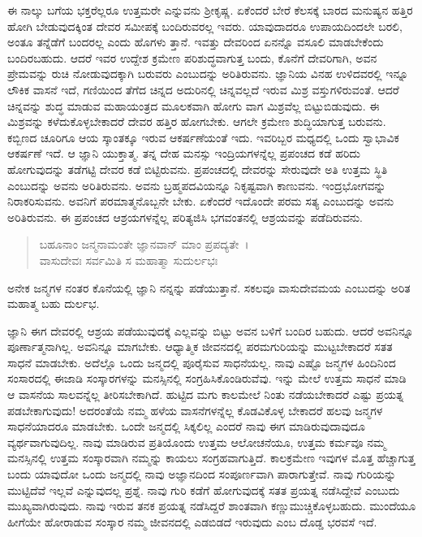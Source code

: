 ಈ ನಾಲ್ಕು ಬಗೆಯ ಭಕ್ತರೆಲ್ಲರೂ ಉತ್ತಮರೇ ಎನ್ನುವನು ಶ‍್ರೀಕೃಷ್ಣ. ಏಕೆಂದರೆ ಬೇರೆ ಕೆಲಸಕ್ಕೆ ಬಾರದ ಮನುಷ್ಯನ ಹತ್ತಿರ ಹೋಗಿ ಬೇಡುವುದಕ್ಕಿಂತ ದೇವರ ಸಮೀಪಕ್ಕೆ ಬಂದಿರುವರಲ್ಲ ಇವರು. ಯಾವುದಾದರೂ ಉಪಾಯದಿಂದಲೇ ಬರಲಿ, ಅಂತೂ ತನ್ನೆಡೆಗೆ ಬಂದರಲ್ಲ ಎಂದು ಹೊಗಳು ತ್ತಾನೆ. ಇವತ್ತು ದೇವರಿಂದ ಏನನ್ನೊ ವಸೂಲಿ ಮಾಡಬೇಕೆಂದು ಬಂದಿರಬಹುದು. ಆದರೆ ಇವರ ಉದ್ದೇಶ ಕ್ರಮೇಣ ಪರಿಶುದ್ಧವಾಗುತ್ತ ಬಂದು, ಕೊನೆಗೆ ದೇವರಿಗಾಗಿ, ಅವನ ಪ್ರೇಮವನ್ನು ರುಚಿ ನೋಡುವುದಕ್ಕಾಗಿ ಬರುವರು ಎಂಬುದನ್ನು ಅರಿತಿರುವನು. ಜ್ಞಾನಿಯ ವಿನಹ ಉಳಿದವರಲ್ಲಿ ಇನ್ನೂ ಲೌಕಿಕ ವಾಸನೆ ಇದೆ, ಗಣಿಯಿಂದ ತೆಗೆದ ಚಿನ್ನದ ಅದುರಿನಲ್ಲಿ ಚಿನ್ನವಲ್ಲದೆ ಇರುವ ಮಿಶ್ರ ವಸ್ತುಗಳಿರುವಂತೆ. ಆದರೆ ಚಿನ್ನವನ್ನು ಶುದ್ಧ ಮಾಡುವ ಮಹಾಯಂತ್ರದ ಮೂಲಕವಾಗಿ ಹೋಗು ವಾಗ ಮಿಶ್ರವೆಲ್ಲ ಬಿಟ್ಟುಬಿಡುವುದು. ಈ ಮಿಶ್ರವನ್ನು ಕಳೆದುಕೊಳ್ಳಬೇಕಾದರೆ ದೇವರ ಹತ್ತಿರ ಹೋಗಬೇಕು. ಆಗಲೇ ಕ್ರಮೇಣ ಶುದ್ಧಿಯಾಗುತ್ತ ಬರುವನು. ಕಬ್ಬಿಣದ ಚೂರಿಗೂ ಆಯ ಸ್ಕಾಂತಕ್ಕೂ ಇರುವ ಆಕರ್ಷಣೆಯಂತೆ ಇದು. ಇವರಿಬ್ಬರ ಮಧ್ಯದಲ್ಲಿ ಒಂದು ಸ್ವಾಭಾವಿಕ ಆಕರ್ಷಣೆ ಇದೆ. ಆ ಜ್ಞಾನಿ ಯುಕ್ತಾತ್ಮ. ತನ್ನ ದೇಹ ಮನಸ್ಸು ಇಂದ್ರಿಯಗಳನ್ನೆಲ್ಲ ಪ್ರಪಂಚದ ಕಡೆ ಹರಿದು ಹೋಗುವುದನ್ನು ತಡೆಗಟ್ಟಿ ದೇವರ ಕಡೆ ಬಿಟ್ಟಿರುವನು. ಪ್ರಪಂಚದಲ್ಲಿ ದೇವರನ್ನು ಸೇರುವುದೇ ಅತಿ ಉತ್ತಮ ಸ್ಥಿತಿ ಎಂಬುದನ್ನು ಅವನು ಅರಿತಿರುವನು. ಅವನು ಬ್ರಹ್ಮಪದವಿಯನ್ನೂ ನಿಕೃಷ್ಟವಾಗಿ ಕಾಣುವನು. ಇಂದ್ರಭೋಗವನ್ನು ನಿರಾಕರಿಸುವನು. ಅವನಿಗೆ ಪರಮಾತ್ಮನೊಬ್ಬನೇ ಬೇಕು. ಏಕೆಂದರೆ ಇದೊಂದೇ ಪರಮ ಸತ್ಯ ಎಂಬುದನ್ನು ಅವನು ಅರಿತಿರುವನು. ಈ ಪ್ರಪಂಚದ ಆಶ್ರಯಗಳನ್ನೆಲ್ಲ ಪರಿತ್ಯಜಿಸಿ ಭಗವಂತನಲ್ಲಿ ಆಶ್ರಯವನ್ನು ಪಡೆದಿರುವನು.

\begin{verse}
ಬಹೂನಾಂ ಜನ್ಮನಾಮಂತೇ ಜ್ಞಾನವಾನ್ ಮಾಂ ಪ್ರಪದ್ಯತೇ~।\\ವಾಸುದೇವಃ ಸರ್ವಮಿತಿ ಸ ಮಹಾತ್ಮಾ ಸುದುರ್ಲಭಃ 
\end{verse}

{\small ಅನೇಕ ಜನ್ಮಗಳ ನಂತರ ಕೊನೆಯಲ್ಲಿ ಜ್ಞಾನಿ ನನ್ನನ್ನು ಪಡೆಯುತ್ತಾನೆ. ಸಕಲವೂ ವಾಸುದೇವಮಯ ಎಂಬುದನ್ನು ಅರಿತ ಮಹಾತ್ಮ ಬಹು ದುರ್ಲಭ.}

ಜ್ಞಾನಿ ಈಗ ದೇವರಲ್ಲಿ ಆಶ್ರಯ ಪಡೆಯುವುದಕ್ಕೆ ಎಲ್ಲವನ್ನು ಬಿಟ್ಟು ಅವನ ಬಳಿಗೆ ಬಂದಿರ ಬಹುದು. ಆದರೆ ಅವನಿನ್ನೂ ಪೂರ್ಣಾತ್ಮನಾಗಿಲ್ಲ. ಅವನಿನ್ನೂ ಮಾಗಬೇಕು. ಆಧ್ಯಾತ್ಮಿಕ ಜೀವನದಲ್ಲಿ ಪರಮಗುರಿಯನ್ನು ಮುಟ್ಟಬೇಕಾದರೆ ಸತತ ಸಾಧನೆ ಮಾಡಬೇಕು. ಅದೆಲ್ಲೊ ಒಂದು ಜನ್ಮದಲ್ಲಿ ಪೂರೈಸುವ ಸಾಧನೆಯಲ್ಲ. ನಾವು ಎಷ್ಟೊ ಜನ್ಮಗಳ ಹಿಂದಿನಿಂದ ಸಂಸಾರದಲ್ಲಿ ಈಜಾಡಿ ಸಂಸ್ಕಾರಗಳನ್ನು ಮನಸ್ಸಿನಲ್ಲಿ ಸಂಗ್ರಹಿಸಿಕೊಂಡಿರುವೆವು. ಇನ್ನು ಮೇಲೆ ಉತ್ತಮ ಸಾಧನೆ ಮಾಡಿ ಆ ವಾಸನೆಯ ಸಾಲವನ್ನೆಲ್ಲ ತೀರಿಸಬೇಕಾಗಿದೆ. ಹುಟ್ಟಿದ ಮಗು ಕಾಲಮೇಲೆ ನಿಂತು ನಡೆಯಬೇಕಾದರೆ ಎಷ್ಟು ಪ್ರಯತ್ನ ಪಡಬೇಕಾಗುವುದು! ಅದರಂತೆಯೆ ನಮ್ಮ ಹಳೆಯ ವಾಸನೆಗಳನ್ನೆಲ್ಲ ಕೊಡವಿಕೊಳ್ಳ ಬೇಕಾದರೆ ಹಲವು ಜನ್ಮಗಳ ಸಾಧನೆಯಾದರೂ ಮಾಡಬೇಕು. ಒಂದೇ ಜನ್ಮದಲ್ಲಿ ಸಿಕ್ಕಲಿಲ್ಲ ಎಂದರೆ ನಾವು ಈಗ ಮಾಡಿರುವುದಾವುದೂ ವ್ಯರ್ಥವಾಗುವುದಿಲ್ಲ. ನಾವು ಮಾಡಿರುವ ಪ್ರತಿಯೊಂದು ಉತ್ತಮ ಆಲೋಚನೆಯೂ, ಉತ್ತಮ ಕರ್ಮವೂ ನಮ್ಮ ಮನಸ್ಸಿನಲ್ಲಿ ಉತ್ತಮ ಸಂಸ್ಕಾರವಾಗಿ ನಮ್ಮನ್ನು ಕಾಯಲು ಸಂಗ್ರಹವಾಗುತ್ತಿದೆ. ಕಾಲಕ್ರಮೇಣ ಇವುಗಳ ಮೊತ್ತ ಹೆಚ್ಚಾಗುತ್ತ ಬಂದು ಯಾವುದೋ ಒಂದು ಜನ್ಮದಲ್ಲಿ ನಾವು ಅಜ್ಞಾನದಿಂದ ಸಂಪೂರ್ಣವಾಗಿ ಪಾರಾಗುತ್ತೇವೆ. ನಾವು ಗುರಿಯನ್ನು ಮುಟ್ಟಿದೆವೆ ಇಲ್ಲವೆ ಎನ್ನುವುದಲ್ಲ ಪ್ರಶ್ನೆ. ನಾವು ಗುರಿ ಕಡೆಗೆ ಹೋಗುವುದಕ್ಕೆ ಸತತ ಪ್ರಯತ್ನ ನಡೆಸಿದ್ದೇವೆ ಎಂಬುದು ಮುಖ್ಯವಾಗಿರುವುದು. ನಾವು ಇರುವ ತನಕ ಪ್ರಯತ್ನ ನಡೆಸಿದ್ದರೆ ಶಾಂತವಾಗಿ ಕಣ್ಣುಮುಚ್ಚಿಕೊಳ್ಳಬಹುದು. ಮುಂದೆಯೂ ಹೀಗೆಯೇ ಹೋರಾಡುವ ಸಂಸ್ಕಾರ ನಮ್ಮ ಜೀವನದಲ್ಲಿ ಎಡಬಿಡದೆ ಇರುವುದು ಎಂಬ ದೊಡ್ಡ ಭರವಸೆ ಇದೆ.

